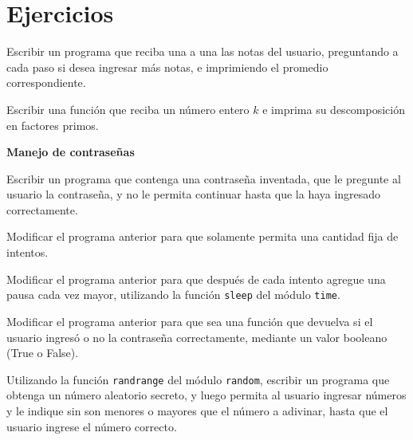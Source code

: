 \newpage
\section{Ejercicios}

\begin{ejercicio}
Escribir un programa que reciba una a una las notas del usuario,
preguntando a cada paso si desea ingresar más notas, e imprimiendo el
promedio correspondiente.
\end{ejercicio}

\begin{ejercicio}
Escribir una función que reciba un número entero $k$ e imprima su
descomposición en factores primos.
\end{ejercicio}

\begin{ejercicio}
{\bf Manejo de contraseñas}
\begin{partes}
    \item Escribir un programa que contenga una contraseña inventada, que le
pregunte al usuario la contraseña, y no le permita continuar hasta que la
haya ingresado correctamente.
    \item Modificar el programa anterior para que solamente permita una
cantidad fija de intentos.
    \item Modificar el programa anterior para que después de cada intento
agregue una pausa cada vez mayor, utilizando la función \verb!sleep! del
módulo \verb!time!.
    \item Modificar el programa anterior para que sea una función que devuelva
si el usuario ingresó o no la contraseña correctamente, mediante un valor
booleano (True o False).
\end{partes}
\end{ejercicio}


\begin{ejercicio}
Utilizando la función \verb!randrange! del módulo \verb!random!,
escribir un programa que obtenga un número aleatorio secreto, y luego
permita al usuario ingresar números y le indique sin son menores o mayores
que el número a adivinar, hasta que el usuario ingrese el número correcto.
\end{ejercicio}


